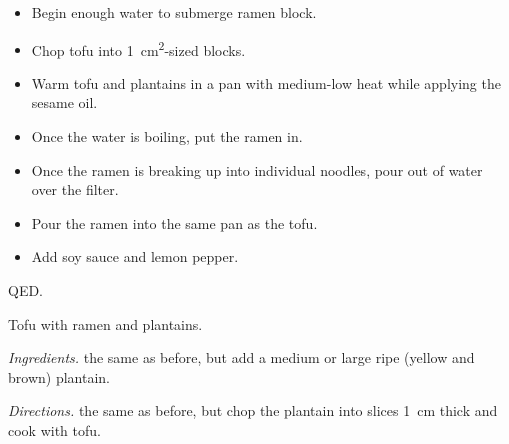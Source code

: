 \documentclass{amsbook}
\begin{document}
\begin{itemize}
	\item Begin enough water to submerge ramen block.
	\item Chop tofu into 1\ cm\textsuperscript{2}-sized blocks.
	\item Warm tofu and plantains in a pan with medium-low heat while applying
		the sesame oil.
	\item Once the water is boiling, put the ramen in.
	\item Once the ramen is breaking up into individual noodles, pour out of
		water over the filter.
	\item Pour the ramen into the same pan as the tofu.
	\item Add soy sauce and lemon pepper.
\end{itemize}

QED.

\begin{cor} Tofu with ramen and plantains. \end{cor}
\textit{Ingredients.} the same as before, but add a medium or large ripe
(yellow and brown) plantain.

\textit{Directions.} the same as before, but chop the plantain into slices 1\
cm thick and cook with tofu.
\end{document}
